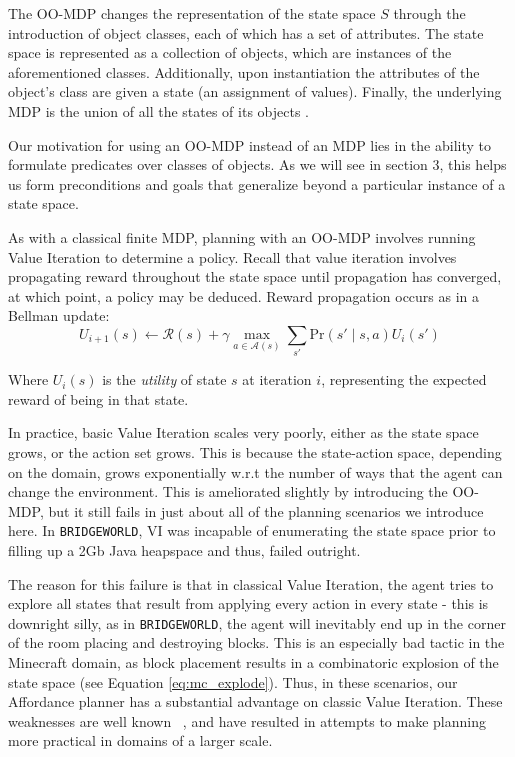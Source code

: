 \documentclass[]{article}
\begin{document}
The OO-MDP changes the representation of the state space $S$ through the introduction of object classes, each of which has a set of attributes. The state space is represented as a collection of objects, which are instances of the aforementioned classes. Additionally, upon instantiation the attributes of the object's class are given a state (an assignment of values). Finally, the underlying MDP is the union of all the states of its objects \citep{diuk08}.

Our motivation for using an OO-MDP instead of an MDP lies in the ability to formulate predicates over classes of objects. As we will see in section 3, this helps us form preconditions and goals that generalize beyond a particular instance of a state space.

As with a classical finite MDP, planning with an OO-MDP involves running Value Iteration to determine a policy. Recall that value iteration involves propagating reward throughout the state space until propagation has converged, at which point, a policy may be deduced. Reward propagation occurs as in a Bellman update:
\begin{equation}
U_{i+1}(s) \leftarrow \mathcal{R}(s) + \gamma \max_{a \in \mathcal{A}(s)} \sum_{s'} \text{Pr}(s' \mid s, a)U_i(s')
\end{equation}

Where $U_i(s)$ is the {\it utility} of state $s$ at iteration $i$, representing the expected reward of being in that state.

In practice, basic Value Iteration scales very poorly, either as the state space grows, or the action set grows. This is because the state-action space, depending on the domain, grows exponentially w.r.t the number of ways that the agent can change the environment. This is ameliorated slightly by introducing the OO-MDP, but it still fails in just about all of the planning scenarios we introduce here. In \texttt{BRIDGEWORLD}, VI was incapable of enumerating the state space prior to filling up a 2Gb Java heapspace and thus, failed outright.

The reason for this failure is that in classical Value Iteration, the agent tries to explore all states that result from applying every action in every state - this is downright silly, as in \texttt{BRIDGEWORLD}, the agent will inevitably end up in the corner of the room placing and destroying blocks. This is an especially bad tactic in the Minecraft domain, as block placement results in a combinatoric explosion of the state space (see Equation \ref{eq:mc_explode}). Thus, in these scenarios, our Affordance planner has a substantial advantage on classic Value Iteration. These weaknesses are well known ~\citep{grounds05}, and have resulted in attempts to make planning more practical in domains of a larger scale.
\end{document}
